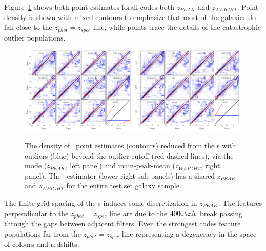 Figure~\ref{fig:pz_pointestimates} shows both point estimates forall codes  both $z_{PEAK}$ and $z_{WEIGHT}$.
Point density is shown with mixed contours to emphasize that most of the galaxies do fall close to the $z_{phot} = z_{spec}$ line, while points trace the details of the catastrophic outlier populations.

\begin{figure}
\centering
\includegraphics[width=0.49\textwidth]{fig/ZPEAK_szpz_threecolumn_12codes_navy_lowalpha.jpg}
\includegraphics[width=0.49\textwidth]{fig/ZWEIGHT_szpz_threecolumn_12codes_navy_lowalpha.jpg}
\caption{The density of \pz\ point estimates (contours) reduced from the \pzpdf s with outliers (blue) beyond the outlier cutoff (red dashed lines), via the mode ($z_{PEAK}$, left panel) and main-peak-mean ($z_{WEIGHT}$, right panel).
The \trainz\ estimator (lower right sub-panels) has a shared $z_{PEAK}$ and $z_{WEIGHT}$ for the entire test set galaxy sample.}
\label{fig:pz_pointestimates}
\end{figure}

The finite grid spacing of the \pzpdf s induces some discretization in $z_{PEAK}$.%
The features perpendicular to the $z_{phot} = z_{spec}$ line are due to the $4000 \rm{\AA}$ break passing through the gaps between adjacent filters.%
Even the strongest codes feature populations far from the $z_{phot} = z_{spec}$ line representing a degeneracy in the space of colours and redshifts.

